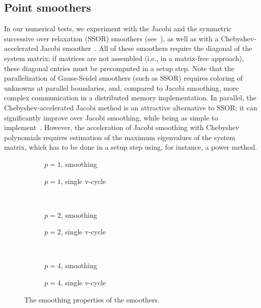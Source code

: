 \documentclass[smallcondensed,final]{svjour3}     %
\begin{document}
\subsection{Point smoothers}\label{subsec:ptsmoothers}
In our numerical tests, we experiment with the Jacobi and the
symmetric successive over relaxation (SSOR) smoothers
(see~\cite{TrottenbergOosterleeSchuller01}), as well as with a
Chebyshev-accelerated Jacobi smoother~\cite{....}. All of these
smoothers require the diagonal of the system matrix; if matrices are
not assembled (i.e., in a matrix-free approach), these diagonal
entries must be precomputed in a setup step.  Note that the
parallelization of Gauss-Seidel smoothers (such as SSOR) requires
coloring of unknowns at parallel boundaries, and, compared to Jacobi
smoothing, more complex communication in a distributed memory
implementation. In parallel, the Chebyshev-accelerated Jacobi method
is an attractive alternative to SSOR; it can significantly improve
over Jacobi smoothing, while being as simple to
implement~\cite{AdamsBrezinaHuEtAl03}. However, the acceleration of
Jacobi smoothing with Chebyshev polynomials requires estimation of the
maximum eigenvalues of the system matrix, which has to be done in a
setup step using, for instance, a power method.
\begin{figure}
	\centering
	\begin{subfigure}[b]{0.49\textwidth}
		
		\caption{$p=1$, smoothing}
	\end{subfigure}
	\begin{subfigure}[b]{0.49\textwidth}
		
		\caption{$p=1$, single v-cycle}
	\end{subfigure}
	\\
	\begin{subfigure}[b]{0.49\textwidth}
		
		\caption{$p=2$, smoothing}
	\end{subfigure}
	\begin{subfigure}[b]{0.49\textwidth}
		
		\caption{$p=2$, single v-cycle}
	\end{subfigure}
	\\
	\begin{subfigure}[b]{0.49\textwidth}
		
		\caption{$p=4$, smoothing}
	\end{subfigure}
	\begin{subfigure}[b]{0.49\textwidth}
		
		\caption{$p=4$, single v-cycle}
	\end{subfigure}
	\caption{\label{fig:smoothers2} The smoothing properties of the smoothers.}
\end{figure}
\end{document}
